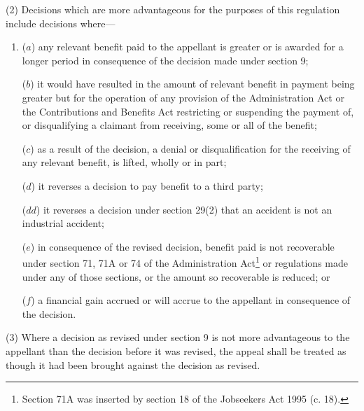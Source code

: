 \documentclass[12pt,a4paper]{article}
\begin{document}
(2) Decisions which are more advantageous for the purposes of this regulation include decisions where—
\begin{enumerate}\item[]
($a$) any relevant benefit paid to the appellant is greater or is awarded for a longer period in consequence of the decision made under section 9;

($b$) it would have resulted in the amount of relevant benefit in payment being greater but for the operation of any provision of the Administration Act or the Contributions and Benefits Act restricting or suspending the payment of, or disqualifying a claimant from receiving, some or all of the benefit;

($c$) as a result of the decision, a denial or disqualification for the receiving of any relevant benefit, is lifted, wholly or in part;

($d$) it reverses a decision to pay benefit to a third party;

($dd$) it reverses a decision under section 29(2) that an accident is not an industrial accident;

($e$) in consequence of the revised decision, benefit paid is not recoverable under section 71, 71A or 74 of the Administration Act\footnote{\frenchspacing Section 71A was inserted by section 18 of the Jobseekers Act 1995 (c. 18).} or regulations made under any of those sections, or the amount so recoverable is reduced; or

($f$) a financial gain accrued or will accrue to the appellant in consequence of the decision.
\end{enumerate}


(3) Where a decision as revised under section 9 is not more advantageous to the appellant than the decision before it was revised, the appeal shall be treated as though it had been brought against the decision as revised.
\end{document}
